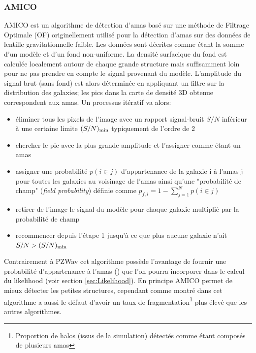 \documentclass[a4paper,11pt]{article}
\numberwithin{equation}{section}
\begin{document}
    \subsubsection{AMICO}
      AMICO est un algorithme de détection d'amas basé sur une méthode de Filtrage Optimale (OF) originellement utilisé pour la détection d'amas sur des données de lentille gravitationnelle faible\cite{AMICO}. Les données sont décrites comme étant la somme d'un modèle et d'un fond non-uniforme. 
	  La densité surfacique du fond est calculée localement autour de chaque grande structure mais suffisamment loin pour ne pas prendre en compte le signal provenant du modèle.\newline      
      L'amplitude du signal brut (sans fond) est alors déterminée en appliquant un filtre sur la distribution des galaxies; les pics dans la carte de densité 3D obtenue correspondent aux amas. Un processus itératif va alors:
	\begin{itemize}
		\item éliminer tous les pixels de l'image avec un rapport signal-bruit $S/N$ inférieur à une certaine limite $(S/N)_{\rm{min}}$ typiquement de l'ordre de 2
		\item chercher le pic avec la plus grande amplitude et l'assigner comme étant un amas
		\item assigner une probabilité $p(i \in j)$ d'appartenance de la galaxie i à l'amas j pour toutes les galaxies au voisinage de l'amas ainsi qu'une "probabilité de champ" (\textit{field probability}) définie comme $p_{f,i} = 1 - \sum_{j=1}^N p(i \in j)$
		\item retirer de l'image le signal du modèle pour chaque galaxie multiplié par la probabilité  de champ
		\item recommencer depuis l'étape 1 jusqu'à ce que plus aucune galaxie n'ait $S/N > (S/N)_{\rm{min}}$
	\end{itemize}	      
       
      Contrairement à PZWav cet algorithme possède l'avantage de fournir une probabilité d'appartenance à l'amas () que l'on pourra incorporer dans le calcul du likelihood (voir section \ref{sec:Likelihood}). En principe AMICO permet de mieux détecter les petites structures, cependant comme montré dans \cite{EUCLID} cet algorithme a aussi le défaut d'avoir un taux de fragmentation\footnote{Proportion de halos (issus de la simulation) détectés comme étant composés de plusieurs amas} plus élevé que les autres algorithmes.
      
\end{document}
